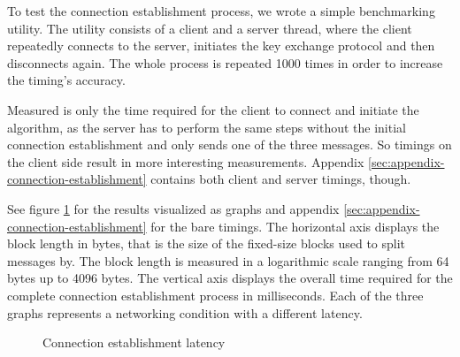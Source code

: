 To test the connection establishment process, we wrote a simple benchmarking utility.
The utility consists of a client and a server thread, where the client repeatedly connects to the server, initiates the key exchange protocol and then disconnects again.
The whole process is repeated 1000 times in order to increase the timing's accuracy.

Measured is only the time required for the client to connect and initiate the algorithm, as the server has to perform the same steps without the initial connection establishment and only sends one of the three messages.
So timings on the client side result in more interesting measurements.
Appendix \ref{sec:appendix-connection-establishment} contains both client and server timings, though.

See figure \ref{fig:connection-establishment} for the results visualized as graphs and appendix \ref{sec:appendix-connection-establishment} for the bare timings.
The horizontal axis displays the block length in bytes, that is the size of the fixed-size blocks used to split messages by.
The block length is measured in a logarithmic scale ranging from 64 bytes up to 4096 bytes.
The vertical axis displays the overall time required for the complete connection establishment process in milliseconds.
Each of the three graphs represents a networking condition with a different latency.

\begin{figure}[t]
    \centering
    \caption{Connection establishment latency}
    \label{fig:connection-establishment}
\end{figure}

